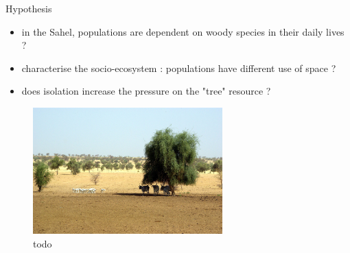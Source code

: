 \documentclass[newPxFont]{beamer}
\begin{document}
%
%

\begin{frame}[c]{Hypothesis}
\vspace{-1cm}
\begin{itemize}
  \item in the Sahel, populations are dependent on woody species in their daily lives ?
  \item  characterise the socio-ecosystem : populations have different use of space ?
  \item does isolation increase the pressure on the "tree" resource ?
\end{itemize}
\begin{figure}
	\centering
	\includegraphics[width = 0.65\textwidth]{img/2007-11-05_Podor_3733.JPG}
	\caption{todo}
\end{figure}
\end{frame}

\end{document}
